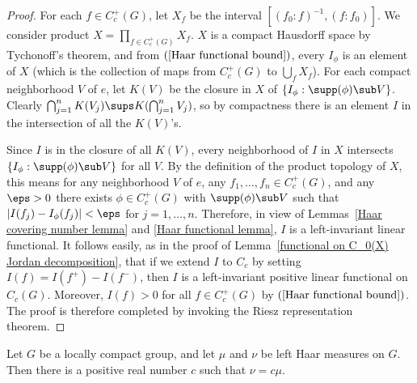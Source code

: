 \begin{proof}
For each $f\in C_c^+(G)$, let $X_f$ be the interval $[(f_0:f)^{-1},(f:f_0)]$. We consider product $X=\prod_{f\in C_c^+(G)}X_f$. $X$ is a compact Hausdorff space by Tychonoff's theorem, and from $(\ref{Haar functional bound})$, every $I_\phi$ is an element of $X$ (which is the collection of maps from $C_c^+(G)$ to $\bigcup_fX_f$). For each compact neighborhood $V$ of $e$, let $K(V)$ be the closure in $X$ of $\{I_\phi:\supp(\phi)\sub V\}$. Clearly $\bigcap_{j=1}^{n}K(V_j)\sups K(\bigcap_{j=1}^{n}V_j)$, so by compactness there is an element $I$ in the intersection of all the $K(V)$'s.\par
Since $I$ is in the closure of all $K(V)$, every neighborhood of $I$ in $X$ intersects $\{I_\phi:\supp(\phi)\sub V\}$ for all $V$. By the definition of the product topology of $X$, this means for any neighborhood $V$ of $e$, any $f_1,\dots,f_n\in C_c^+(G)$, and any $\eps>0$ there exists $\phi\in C_c^+(G)$ with $\supp(\phi)\sub V$ such that $|I(f_j)-I_\phi(f_j)|<\eps$ for $j=1,\dots,n$. Therefore, in view of Lemmas~\ref{Haar covering number lemma} and \ref{Haar functional lemma}, $I$ is a left-invariant linear functional. It follows easily, as in the proof of Lemma~\ref{functional on C_0(X) Jordan decomposition}, that if we extend $I$ to $C_c$ by setting $I(f)=I(f^+)-I(f^-)$, then $I$ is a left-invariant positive linear functional on $C_c(G)$. Moreover, $I(f)>0$ for all $f\in C_c^+(G)$ by $(\ref{Haar functional bound})$. The proof is therefore completed by invoking the Riesz representation theorem.
\end{proof}
\begin{theorem}\label{Haar measure uniqueness}
Let $G$ be a locally compact group, and let $\mu$ and $\nu$ be left Haar measures on $G$. Then there is a positive real number $c$ such that $\nu=c\mu$.
\end{theorem}

